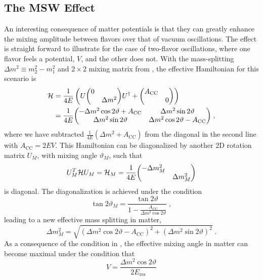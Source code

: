 \subsection{The MSW Effect}
An interesting consequence of matter potentials is that they can greatly enhance the mixing amplitude between flavors over that of vacuum oscillations. The effect is straight forward to illustrate for the case of two-flavor oscillations, where one flavor feels a potential, $V$, and the other does not. With the mass-splitting $\Delta m^2 \equiv m_2^2 - m_1^2$ and $2\times2$ mixing matrix from , the effective Hamiltonian for this scenario is
\begin{equation}
\begin{aligned}
    \mathcal{H}  &= \frac{1}{4E}\left(
        U\mqty(\dmat{0, \Delta m^2})U^\dag + \mqty(\dmat{A_\mathrm{CC}, 0})
    \right)\\
    &= \frac{1}{4E} \mqty(
        -\Delta m^2 \cos 2\vartheta + A_\mathrm{CC} & \Delta m^2 \sin 2\vartheta \\
        \Delta m^2 \sin 2\vartheta & \Delta m^2 \cos 2\vartheta - A_\mathrm{CC}
    )\;,
\end{aligned}
\end{equation}
where we have subtracted $\frac{1}{4E}(\Delta m^2 + A_\mathrm{CC})$ from the diagonal in the second line with $A_\mathrm{CC} = 2E V$. This Hamiltonian can be diagonalized by another 2D rotation matrix $U_M$, with mixing angle $\vartheta_M$, such that
\begin{equation}
    U_M^T\mathcal{H}U_M = \mathcal{H}_M = \frac{1}{4E}\mqty(\dmat{-\Delta m^2_M, \Delta m^2_M})
\end{equation}
is diagonal. The diagonalization is achieved under the condition
\begin{equation}
    \tan 2\vartheta_M = \frac{\tan 2\vartheta}{1 - \frac{A_\mathrm{CC}}{\Delta m^2 \cos 2\vartheta}}\;,\label{eq:msw-condition}
\end{equation}
leading to a new effective mass splitting in matter,
\begin{equation}
    \Delta m^2_M = \sqrt{(\Delta m^2 \cos 2\vartheta - A_\mathrm{CC})^2 + (\Delta m^2\sin 2\vartheta)^2}\;.
\end{equation}
As a consequence of the condition in , the effective mixing angle in matter can become maximal under the condition that
\begin{equation}
    V = \frac{\Delta m^2 \cos 2\vartheta}{2E_\mathrm{res}}\label{eq:msw-pot}
\end{equation}
